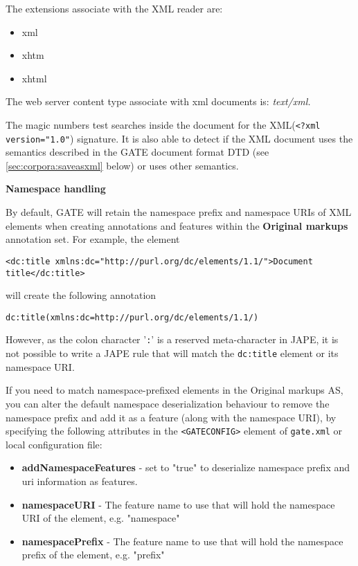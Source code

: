 The extensions associate with the XML reader are:
\begin{itemize}
\item
xml
\item
xhtm
\item
xhtml
\end{itemize}

The web server content type associate with xml documents is: {\em
text/xml.}

The magic numbers test searches inside the document for the XML({\tt <?xml
version="1.0"}) signature. It is also able to detect if the XML document uses the
semantics described in the GATE document format DTD (see
\ref{sec:corpora:saveasxml} below) or uses other semantics.

\textbf{Namespace handling}

By default, GATE will retain the namespace prefix and namespace URIs of XML 
elements when creating annotations and features within the \textbf{Original markups} 
annotation set. For example, the element 
\begin{small}
\begin{verbatim}<dc:title xmlns:dc="http://purl.org/dc/elements/1.1/">Document title</dc:title>\end{verbatim}
\end{small}
will create the following annotation

\begin{small}
\begin{verbatim}dc:title(xmlns:dc=http://purl.org/dc/elements/1.1/)\end{verbatim}
\end{small}

However, as the colon character '{\tt :}' is a reserved meta-character in JAPE, it is
not possible to write a JAPE rule that will match the {\tt dc:title} element or its namespace URI.

If you need to match namespace-prefixed elements in the Original markups AS, you can
alter the default namespace deserialization behaviour to remove the namespace prefix and add it as a feature 
(along with the namespace URI), by specifying the following attributes in the {\tt<GATECONFIG>}
element of {\tt gate.xml} or local configuration file:


\begin{itemize}
\item \textbf{addNamespaceFeatures} - set to "true" to deserialize namespace prefix and uri information as features.
\item \textbf{namespaceURI} - The feature name to use that will hold the namespace URI of the element, e.g. "namespace"
\item \textbf{namespacePrefix} - The feature name to use that will hold the namespace prefix of the element, e.g. "prefix"
\end{itemize}
 
